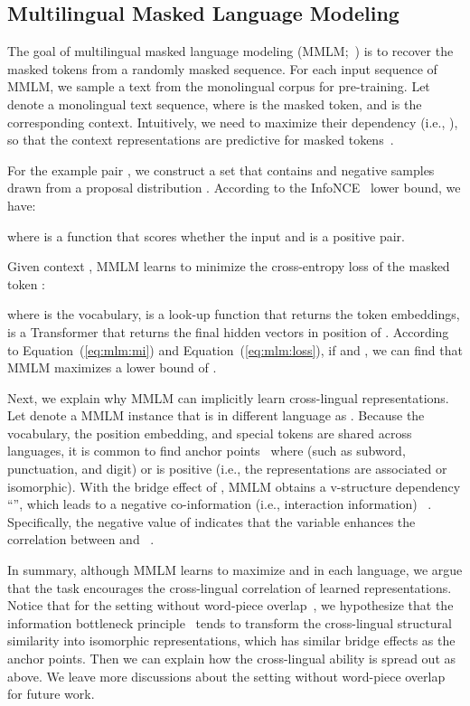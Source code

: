 \documentclass[11pt,a4paper]{article}
\newcommand{\eqform}[1]{Equation~(\ref{#1})}
\begin{document}
\subsection{Multilingual Masked Language Modeling}
\label{sec:mmlm}

The goal of multilingual masked language modeling (MMLM;~\citealt{bert}) is to recover the masked tokens from a randomly masked sequence.
For each input sequence of MMLM, we sample a text from the monolingual corpus for pre-training.
Let  denote a monolingual text sequence, where  is the masked token, and  is the corresponding context.
Intuitively, we need to maximize their dependency (i.e., ), so that the context representations are predictive for masked tokens~\cite{infoword}.

For the example pair , we construct a set  that contains  and  negative samples drawn from a proposal distribution .
According to the InfoNCE~\cite{infonce} lower bound, we have:

where  is a function that scores whether the input  and  is a positive pair.

Given context , MMLM learns to minimize the cross-entropy loss of the masked token :

where  is the vocabulary,  is a look-up function that returns the token embeddings,  is a Transformer that returns the final hidden vectors in position of .
According to \eqform{eq:mlm:mi} and \eqform{eq:mlm:loss}, if  and , we can find that MMLM maximizes a lower bound of .

Next, we explain why MMLM can implicitly learn cross-lingual representations.
Let  denote a MMLM instance that is in different language as .
Because the vocabulary, the position embedding, and special tokens are shared across languages, it is common to find anchor points~\cite{pires2019multilingual,elements:mbert} where  (such as subword, punctuation, and digit) or  is positive (i.e., the representations are associated or isomorphic).
With the bridge effect of , MMLM obtains a v-structure dependency ``'', which leads to a negative co-information (i.e., interaction information) ~\cite{triple:mi}.
Specifically, the negative value of  indicates that the variable  enhances the correlation between  and ~\cite{fano63}.

In summary, although MMLM learns to maximize  and  in each language, we argue that the task encourages the cross-lingual correlation of learned representations.
Notice that for the setting without word-piece overlap~\cite{crosslingual:transfer:of:monolingual,emerging:xlm:acl20,xlingual:mbert:iclr20}, we hypothesize that the information bottleneck principle~\cite{info:bottleneck} tends to transform the cross-lingual structural similarity into isomorphic representations, which has similar bridge effects as the anchor points. Then we can explain how the cross-lingual ability is spread out as above. We leave more discussions about the setting without word-piece overlap for future work.
\end{document}
